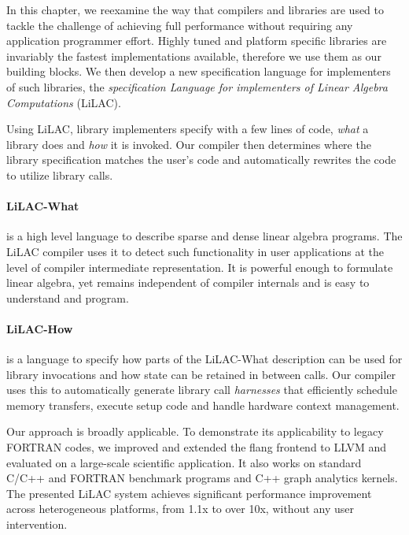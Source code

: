 In this chapter, we reexamine the way that compilers and libraries are used
to tackle the challenge of achieving full performance without requiring any
application programmer effort.
Highly tuned and platform specific libraries are invariably the fastest
implementations available, therefore we use them as our building blocks.
We then develop a new specification language for implementers of such
libraries, the {\em specification Language for implementers of Linear Algebra
Computations} (LiLAC).

Using LiLAC, library implementers specify with a few lines of code,
{\em what} a library does and {\em how} it is invoked.  Our compiler
then determines where the library specification matches the user's
code and automatically rewrites the code to utilize library calls.

\paragraph*{LiLAC-What}
is a high level language to describe sparse and dense linear
algebra programs.
The LiLAC compiler uses it to detect such functionality
in user applications at the level of compiler intermediate representation.
It is powerful enough to formulate linear algebra, yet remains
independent of compiler internals and is easy to understand and program.

\paragraph*{LiLAC-How}
is a language to specify how parts of the LiLAC-What description
can be used for library invocations and how state can be retained in between
calls.
Our compiler uses this to automatically generate library call {\em harnesses} that
efficiently schedule memory transfers, execute setup code and handle hardware
context management.

Our approach is broadly applicable. To demonstrate its applicability
to legacy FORTRAN codes, we improved and extended the flang frontend
to LLVM and evaluated on a large-scale scientific application.
It also works on standard C/C++ and FORTRAN benchmark programs and C++ graph
\mbox{analytics} kernels. The presented LiLAC system achieves significant performance
improvement across heterogeneous platforms, from 1.1x to over 10x, without any
user intervention.

